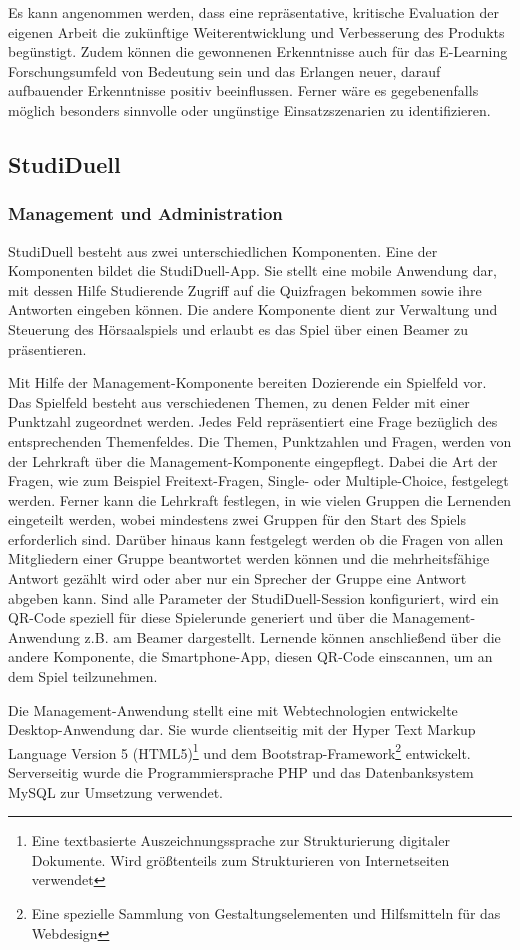 \documentclass[conference]{IEEEtran}
\begin{document}
Es kann angenommen werden, dass eine repräsentative, kritische Evaluation der eigenen Arbeit die zukünftige Weiterentwicklung und Verbesserung des Produkts begünstigt. Zudem können die gewonnenen Erkenntnisse auch für das E-Learning Forschungsumfeld von Bedeutung sein und das Erlangen neuer, darauf aufbauender Erkenntnisse positiv beeinflussen. Ferner wäre es gegebenenfalls möglich besonders sinnvolle oder ungünstige Einsatzszenarien zu identifizieren. 

\subsection{StudiDuell}
\subsubsection{Management und Administration}
StudiDuell besteht aus zwei unterschiedlichen Komponenten. Eine der Komponenten bildet die StudiDuell-App. Sie stellt eine mobile Anwendung dar, mit dessen Hilfe Studierende Zugriff auf die Quizfragen bekommen sowie ihre Antworten eingeben können. Die andere Komponente dient zur Verwaltung und Steuerung des Hörsaalspiels und erlaubt es das Spiel über einen Beamer zu präsentieren. \cite[p. 341]{Hobert2017}

Mit Hilfe der Management-Komponente bereiten Dozierende ein Spielfeld vor. Das Spielfeld besteht aus verschiedenen Themen, zu denen Felder mit einer Punktzahl zugeordnet werden. Jedes Feld repräsentiert eine Frage bezüglich des entsprechenden Themenfeldes. Die Themen, Punktzahlen und Fragen, werden von der Lehrkraft über die Management-Komponente eingepflegt. Dabei die Art der Fragen, wie zum Beispiel Freitext-Fragen, Single- oder Multiple-Choice, festgelegt werden. Ferner kann die Lehrkraft festlegen, in wie vielen Gruppen die Lernenden eingeteilt werden, wobei mindestens zwei Gruppen für den Start des Spiels erforderlich sind. Darüber hinaus kann festgelegt werden ob die Fragen von allen Mitgliedern einer Gruppe beantwortet werden können und die mehrheitsfähige Antwort gezählt wird oder aber nur ein Sprecher der Gruppe eine Antwort abgeben kann. 
Sind alle Parameter der StudiDuell-Session konfiguriert, wird ein QR-Code speziell für diese Spielerunde generiert und über die Management-Anwendung z.B. am Beamer dargestellt. Lernende können anschließend über die andere Komponente, die Smartphone-App, diesen QR-Code einscannen, um an dem Spiel teilzunehmen. \cite[p. 340f]{Hobert2017}

Die Management-Anwendung stellt eine mit Webtechnologien entwickelte Desktop-Anwendung dar. Sie wurde clientseitig mit der Hyper Text Markup Language Version 5 (HTML5)\footnote{Eine textbasierte Auszeichnungssprache zur Strukturierung digitaler Dokumente. Wird größtenteils zum Strukturieren von Internetseiten verwendet} und dem Bootstrap-Framework\footnote{Eine spezielle Sammlung von Gestaltungselementen und Hilfsmitteln für das Webdesign} entwickelt. Serverseitig wurde die Programmiersprache PHP und das Datenbanksystem MySQL zur Umsetzung verwendet. \cite[p. 342]{Hobert2017}
\end{document}
